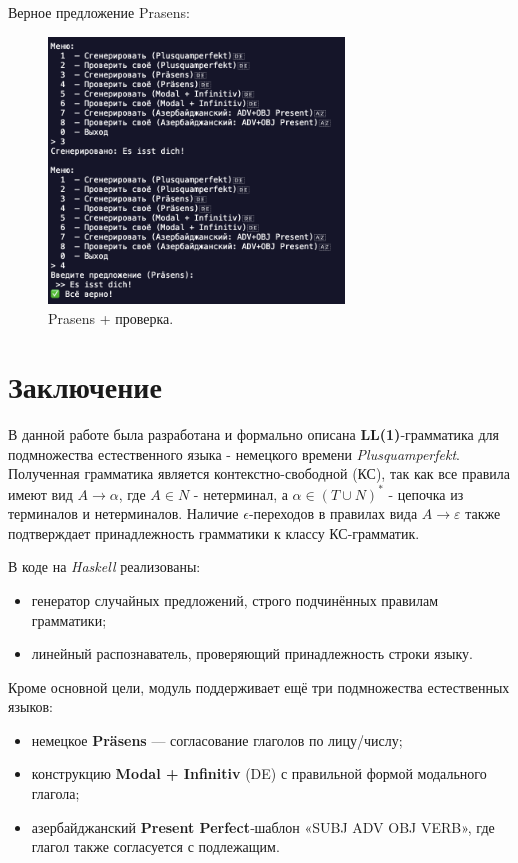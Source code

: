 \documentclass[areasetadvanced]{scrartcl}
\begin{document}
Верное предложение Prasens:
\begin{figure}[H]
	\centering
	\includegraphics[width=0.7\textwidth]{images/image.png}
	\caption{Prasens + проверка.}
	\label{fig:syntdiag}
\end{figure}

\newpage
\section*{Заключение}

В данной работе была разработана и формально описана \textbf{LL(1)}‑грамматика для подмножества естественного языка - немецкого времени \textit{Plusquamperfekt}.  
Полученная грамматика является контекстно-свободной (КС), так как все правила имеют вид $A \to \alpha$, где $A \in N$ - нетерминал, а $\alpha \in (T \cup N)^*$ - цепочка из терминалов и нетерминалов. Наличие $\epsilon$-переходов в правилах вида $A \to \varepsilon$ также подтверждает принадлежность грамматики к классу КС-грамматик.

В коде на \textit{Haskell} реализованы:

\begin{itemize}
  \item генератор случайных предложений, строго подчинённых правилам грамматики;
  \item линейный распознаватель, проверяющий принадлежность строки языку.
\end{itemize}

\medskip
Кроме основной цели, модуль поддерживает ещё три подмножества естественных языков:

\begin{itemize}
  \item немецкое \textbf{Präsens} — согласование глаголов по лицу/числу;
  \item конструкцию \textbf{Modal + Infinitiv} (DE) с правильной формой модального глагола;
  \item азербайджанский \textbf{Present Perfect}‑шаблон «SUBJ ADV OBJ VERB», где глагол
        также согласуется с подлежащим.
\end{itemize}
\end{document}
